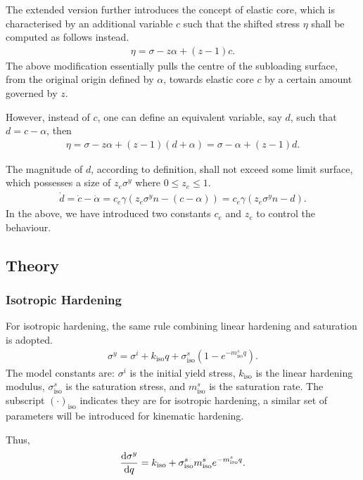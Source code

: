 The extended version further introduces the concept of elastic core, which is characterised by an additional variable $c$ such that the shifted stress $\eta$ shall be computed as follows instead.
\begin{gather}
\eta=\sigma-z\alpha+\left(z-1\right)c.
\end{gather}
The above modification essentially pulls the centre of the subloading surface, from the original origin defined by $\alpha$, towards elastic core $c$ by a certain amount governed by $z$.

However, instead of $c$, one can define an equivalent variable, say $d$, such that $d=c-\alpha$, then
\begin{gather}
\eta=\sigma-z\alpha+\left(z-1\right)\left(d+\alpha\right)=\sigma-\alpha+\left(z-1\right)d.
\end{gather}

The magnitude of $d$, according to definition, shall not exceed some limit surface, which possesses a size of $z_e\sigma^y$ where $0\leqslant{}z_e\leqslant1$.
\begin{gather}
\dot{d}=\dot{c}-\dot{\alpha}=c_e\gamma\left(z_e\sigma^yn-\left(c-\alpha\right)\right)=c_e\gamma\left(z_e\sigma^yn-d\right).
\end{gather}
In the above, we have introduced two constants $c_e$ and $z_e$ to control the behaviour.
\subsection{Theory}
\subsubsection{Isotropic Hardening}
For isotropic hardening, the same rule combining linear hardening and saturation is adopted.
\begin{gather}
    \sigma^y=\sigma^i+k_\text{iso}q+\sigma^s_\text{iso}\left(1-e^{-m^s_\text{iso}q}\right).
\end{gather}
The model constants are: $\sigma^i$ is the initial yield stress, $k_\text{iso}$ is the linear hardening modulus, $\sigma^s_\text{iso}$ is the saturation stress, and $m^s_\text{iso}$ is the saturation rate.
The subscript $\left(\cdot\right)_\text{iso}$ indicates they are for isotropic hardening, a similar set of parameters will be introduced for kinematic hardening.

Thus,
\begin{gather}
\dfrac{\mathrm{d}\sigma^y}{\mathrm{d}q}=k_\text{iso}+\sigma^s_\text{iso}m^s_\text{iso}e^{-m^s_\text{iso}q}.
\end{gather}
